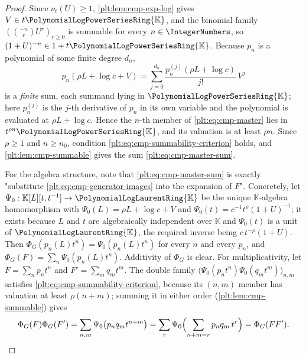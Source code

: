 \documentclass[11pt,oneside]{article}
\theoremstyle{plain}
\theoremstyle{definition}
\theoremstyle{remark}
\newcommand{\K}{\mathbb{K}}
\newcommand{\PLpow}{\PolynomialLogPowerSeriesRing{\K}}   %
\newcommand{\PLlau}{\PolynomialLogLaurentRing{\K}}       %
\newcommand{\ordt}{\nu_{t}}                              %
\begin{document}
\begin{proof}
Since \(\ordt(U)\ge1\), \cref{plt:lem:cmp-exp-log} gives \(V\in t\PLpow\), and
the binomial family \((\binom{-n}{r}U^r)_{r\ge0}\) is summable for every
\(n\in\IntegerNumbers\), so \((1+U)^{-n}\in1+t\PLpow\).  Because \(p_n\) is a
polynomial of some finite degree \(d_n\),
\begin{equation}\label{plt:eq:cmp-poly-shift}
 p_n(\rho L+\log c+V)
 =\sum_{j=0}^{d_n}\frac{p_n^{(j)}(\rho L+\log c)}{j!}\,V^{j}
\end{equation}
is a \emph{finite} sum, each summand lying in \(\PLpow\); here \(p_n^{(j)}\)
is the \(j\)-th derivative of \(p_n\) in its own variable and the polynomial
is evaluated at \(\rho L+\log c\).  Hence the \(n\)-th member of
\eqref{plt:eq:cmp-master} lies in \(t^{\rho n}\PLpow\), and its valuation is
at least \(\rho n\).  Since \(\rho\ge1\) and \(n\ge n_0\), condition
\eqref{plt:eq:cmp-summability-criterion} holds, and
\cref{plt:lem:cmp-summable} gives the sum
\eqref{plt:eq:cmp-master-sum}.

For the algebra structure, note that \eqref{plt:eq:cmp-master-sum} is exactly
"substitute \eqref{plt:eq:cmp-generator-images} into the expansion of \(F\)".
Concretely, let \(\Psi_0:\K[L][t,t^{-1}]\to\PLlau\) be the unique
\(\K\)-algebra homomorphism with \(\Psi_0(L)=\rho L+\log c+V\) and
\(\Psi_0(t)=c^{-1}t^{\rho}(1+U)^{-1}\); it exists because \(L\) and \(t\) are
algebraically independent over \(\K\) and \(\Psi_0(t)\) is a unit of
\(\PLlau\), the required inverse being \(c\,t^{-\rho}(1+U)\).  Then
\(\Phi_G(p_n(L)t^n)=\Psi_0(p_n(L)t^n)\) for every \(n\) and every \(p_n\), and
\(\Phi_G(F)=\sum_n\Psi_0(p_n(L)t^n)\).  Additivity of \(\Phi_G\) is clear.
For multiplicativity, let \(F=\sum_np_nt^n\) and \(F'=\sum_mq_mt^m\).  The
double family \(\bigl(\Psi_0(p_nt^n)\Psi_0(q_mt^m)\bigr)_{n,m}\) satisfies
\eqref{plt:eq:cmp-summability-criterion}, because its \((n,m)\) member has
valuation at least \(\rho(n+m)\); summing it in either order
(\cref{plt:lem:cmp-summable}) gives
\[
 \Phi_G(F)\Phi_G(F')
 =\sum_{n,m}\Psi_0\bigl(p_nq_mt^{n+m}\bigr)
 =\sum_{r}\Psi_0\Bigl(\sum_{n+m=r}p_nq_m\,t^{r}\Bigr)
 =\Phi_G(FF').
\]


\end{proof}
\end{document}
